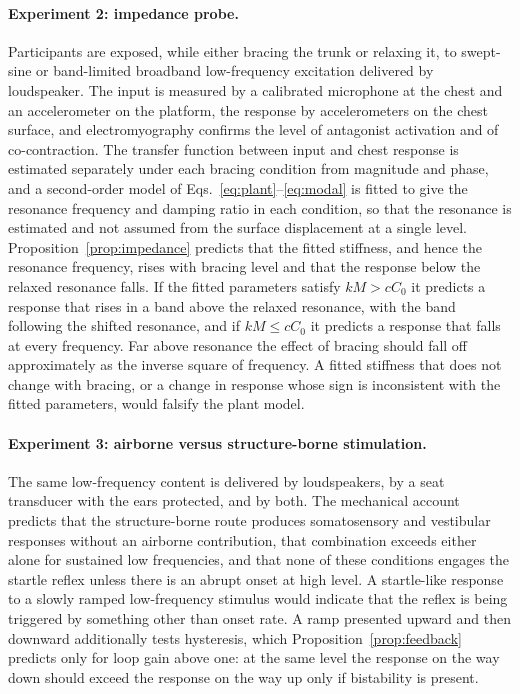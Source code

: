 \documentclass[11pt]{article}
\theoremstyle{plain}
\theoremstyle{definition}
\begin{document}
\paragraph{Experiment 2: impedance probe.}
Participants are exposed, while either bracing the trunk or relaxing it, to swept-sine or band-limited broadband low-frequency excitation delivered by loudspeaker. The input is measured by a calibrated microphone at the chest and an accelerometer on the platform, the response by accelerometers on the chest surface, and electromyography confirms the level of antagonist activation and of co-contraction. The transfer function between input and chest response is estimated separately under each bracing condition from magnitude and phase, and a second-order model of Eqs.~\eqref{eq:plant}--\eqref{eq:modal} is fitted to give the resonance frequency and damping ratio in each condition, so that the resonance is estimated and not assumed from the surface displacement at a single level. Proposition~\ref{prop:impedance} predicts that the fitted stiffness, and hence the resonance frequency, rises with bracing level and that the response below the relaxed resonance falls. If the fitted parameters satisfy $kM>cC_0$ it predicts a response that rises in a band above the relaxed resonance, with the band following the shifted resonance, and if $kM\le cC_0$ it predicts a response that falls at every frequency. Far above resonance the effect of bracing should fall off approximately as the inverse square of frequency. A fitted stiffness that does not change with bracing, or a change in response whose sign is inconsistent with the fitted parameters, would falsify the plant model.

\paragraph{Experiment 3: airborne versus structure-borne stimulation.}
The same low-frequency content is delivered by loudspeakers, by a seat transducer with the ears protected, and by both. The mechanical account predicts that the structure-borne route produces somatosensory and vestibular responses without an airborne contribution, that combination exceeds either alone for sustained low frequencies, and that none of these conditions engages the startle reflex unless there is an abrupt onset at high level. A startle-like response to a slowly ramped low-frequency stimulus would indicate that the reflex is being triggered by something other than onset rate. A ramp presented upward and then downward additionally tests hysteresis, which Proposition~\ref{prop:feedback} predicts only for loop gain above one: at the same level the response on the way down should exceed the response on the way up only if bistability is present.
\end{document}
